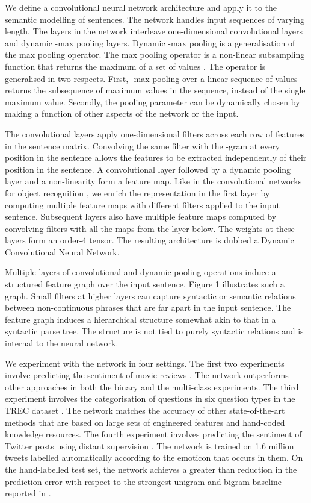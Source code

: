 \documentclass[11pt]{article}
\begin{document}
We define a convolutional neural network architecture and apply it to the semantic modelling of sentences. The network handles input sequences of varying length. The layers in the network interleave one-dimensional convolutional layers and dynamic -max pooling layers. Dynamic -max pooling is a generalisation of the max pooling operator. The max pooling operator is a non-linear  subsampling function that returns the maximum of a set of values \cite{lecun-98}. The operator is generalised in two respects. First, -max pooling over a linear sequence of values returns the subsequence of  maximum values in the sequence, instead of the single maximum value. Secondly, the pooling parameter  can be dynamically chosen by making  a function of other aspects of the network or the input. 

The convolutional layers apply one-dimensional filters across each row of features in the sentence matrix. Convolving the same filter with the -gram at every position in the sentence allows the features to be extracted independently of their position in the sentence. A convolutional layer followed by a dynamic pooling layer and a non-linearity form a feature map. Like in the convolutional networks for object recognition \cite{lecun-98}, we enrich the representation in the first layer by computing multiple feature maps with different filters applied to the input sentence. Subsequent layers also have multiple feature maps computed by convolving filters with all the maps from the layer below. The weights at these layers form an order-4 tensor. The resulting architecture is dubbed a Dynamic Convolutional Neural Network.




Multiple layers of convolutional and dynamic pooling operations induce a structured feature graph over the input sentence. Figure 1 illustrates such a graph. Small filters at higher layers can capture syntactic or semantic relations between non-continuous phrases that are far apart in the input sentence. The feature graph induces  a hierarchical structure somewhat akin to that in a syntactic parse tree. The structure is not tied to purely syntactic relations and is internal to the neural network.



We experiment with the network in four settings. The first two experiments involve predicting the sentiment of movie reviews \cite{Socher-etal:2013}. The network outperforms other approaches in both the binary and the multi-class experiments. The third experiment involves the categorisation of questions in six question types in the TREC dataset \cite{li2002learning}. The network matches the accuracy of other state-of-the-art methods that are based on large sets of engineered features and hand-coded knowledge resources. 
The fourth experiment involves predicting the sentiment of Twitter posts using distant supervision \cite{Go_Bhayani_Huang_2009}. The network is trained on 1.6 million tweets labelled automatically according to the emoticon that occurs in them. On the hand-labelled test set, the network achieves a greater than  reduction in the prediction error with respect to the strongest unigram and bigram baseline reported in .
\end{document}

